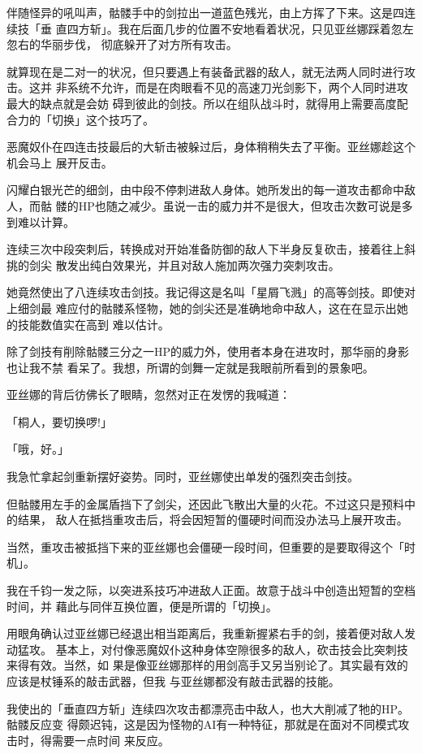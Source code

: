 \documentclass[11pt]{book}
\begin{document}
伴随怪异的吼叫声，骷髅手中的剑拉出一道蓝色残光，由上方挥了下来。这是四连续技「垂
直四方斩」。我在后面几步的位置不安地看着状况，只见亚丝娜踩着忽左忽右的华丽步伐，
彻底躲开了对方所有攻击。

就算现在是二对一的状况，但只要遇上有装备武器的敌人，就无法两人同时进行攻击。这并
非系统不允许，而是在肉眼看不见的高速刀光剑影下，两个人同时进攻最大的缺点就是会妨
碍到彼此的剑技。所以在组队战斗时，就得用上需要高度配合力的「切换」这个技巧了。

恶魔奴仆在四连击技最后的大斩击被躲过后，身体稍稍失去了平衡。亚丝娜趁这个机会马上
展开反击。

闪耀白银光芒的细剑，由中段不停刺进敌人身体。她所发出的每一道攻击都命中敌人，而骷
髅的HP也随之减少。虽说一击的威力并不是很大，但攻击次数可说是多到难以计算。

连续三次中段突刺后，转换成对开始准备防御的敌人下半身反复砍击，接着往上斜挑的剑尖
散发出纯白效果光，并且对敌人施加两次强力突刺攻击。

她竟然使出了八连续攻击剑技。我记得这是名叫「星屑飞溅」的高等剑技。即使对上细剑最
难应付的骷髅系怪物，她的剑尖还是准确地命中敌人，这在在显示出她的技能数值实在高到
难以估计。

除了剑技有削除骷髅三分之一HP的威力外，使用者本身在进攻时，那华丽的身影也让我不禁
看呆了。我想，所谓的剑舞一定就是我眼前所看到的景象吧。

亚丝娜的背后彷佛长了眼睛，忽然对正在发愣的我喊道：

「桐人，要切换啰!」

「哦，好。」

我急忙拿起剑重新摆好姿势。同时，亚丝娜使出单发的强烈突击剑技。

但骷髅用左手的金属盾挡下了剑尖，还因此飞散出大量的火花。不过这只是预料中的结果，
敌人在抵挡重攻击后，将会因短暂的僵硬时间而没办法马上展开攻击。

当然，重攻击被抵挡下来的亚丝娜也会僵硬一段时间，但重要的是要取得这个「时机」。

我在千钧一发之际，以突进系技巧冲进敌人正面。故意于战斗中创造出短暂的空档时间，并
藉此与同伴互换位置，便是所谓的「切换」。

用眼角确认过亚丝娜已经退出相当距离后，我重新握紧右手的剑，接着便对敌人发动猛攻。
基本上，对付像恶魔奴仆这种身体空隙很多的敌人，砍击技会比突刺技来得有效。当然，如
果是像亚丝娜那样的用剑高手又另当别论了。其实最有效的应该是杖锤系的敲击武器，但我
与亚丝娜都没有敲击武器的技能。

我使出的「垂直四方斩」连续四次攻击都漂亮击中敌人，也大大削减了牠的HP。骷髅反应变
得颇迟钝，这是因为怪物的AI有一种特征，那就是在面对不同模式攻击时，得需要一点时间
来反应。
\end{document}
